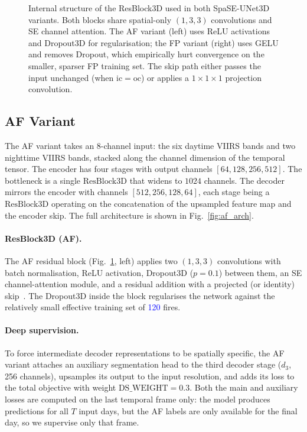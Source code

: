 \documentclass[sensors,article,submit,moreauthors,pdftex]{Definitions/mdpi}
\newcommand{\rev}[1]{\textcolor{blue}{#1}}
\begin{document}
\begin{figure}[h]
\centering

\caption{Internal structure of the ResBlock3D used in both SpaSE-UNet3D variants. Both blocks share spatial-only $(1,3,3)$ convolutions and SE channel attention. The AF variant (left) uses ReLU activations and Dropout3D for regularisation; the FP variant (right) uses GELU and removes Dropout, which empirically hurt convergence on the smaller, sparser FP training set. The skip path either passes the input unchanged (when $\mathrm{ic} = \mathrm{oc}$) or applies a $1 \times 1 \times 1$ projection convolution.}
\label{fig:resblock}
\end{figure}

\subsection{AF Variant}

The AF variant takes an 8-channel input: the six daytime VIIRS bands and two nighttime VIIRS bands, stacked along the channel dimension of the temporal tensor. The encoder has four stages with output channels $[64, 128, 256, 512]$. The bottleneck is a single $\mathrm{ResBlock3D}$ that widens to $1024$ channels. The decoder mirrors the encoder with channels $[512, 256, 128, 64]$, each stage being a $\mathrm{ResBlock3D}$ operating on the concatenation of the upsampled feature map and the encoder skip. The full architecture is shown in Fig.~\ref{fig:af_arch}.

\paragraph*{ResBlock3D (AF).} The AF residual block (Fig.~\ref{fig:resblock}, left) applies two $(1,3,3)$ convolutions with batch normalisation, ReLU activation, Dropout3D ($p = 0.1$) between them, an SE channel-attention module, and a residual addition with a projected (or identity) skip~\cite{he2016deep}. The Dropout3D inside the block regularises the network against the relatively small effective training set of \rev{120} fires.

\paragraph*{Deep supervision.} To force intermediate decoder representations to be spatially specific, the AF variant attaches an auxiliary segmentation head to the third decoder stage ($d_3$, 256 channels), upsamples its output to the input resolution, and adds its loss to the total objective with weight $\mathrm{DS\_WEIGHT} = 0.3$. Both the main and auxiliary losses are computed on the last temporal frame only: the model produces predictions for all $T$ input days, but the AF labels are only available for the final day, so we supervise only that frame.
\end{document}
